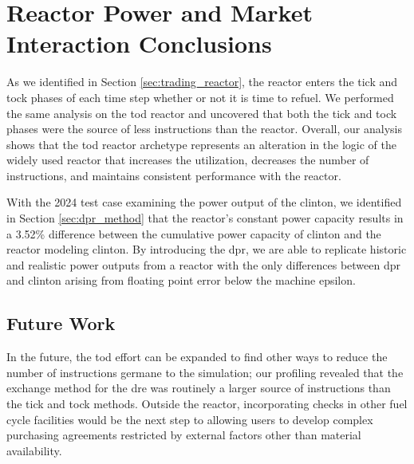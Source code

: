 \section{Reactor Power and Market Interaction Conclusions}

As we identified in Section \ref{sec:trading_reactor}, the \cycamore reactor enters the tick and tock phases of each time step whether or not it is time to refuel. We performed the same analysis on the \gls{tod} reactor and uncovered that both the tick and tock phases were the source of less instructions than the \cycamore reactor. Overall, our analysis shows that the \gls{tod} reactor archetype represents an alteration in the logic of the widely used \cycamore reactor that increases the utilization, decreases the number of instructions, and maintains consistent performance with the \cycamore reactor.

With the 2024 test case examining the power output of the \gls{clinton}, we identified in Section \ref{sec:dpr_method} that the \cycamore reactor's constant power capacity results in a 3.52\% difference between the cumulative power capacity of \gls{clinton} and the \cycamore reactor modeling \gls{clinton}. By introducing the \gls{dpr}, we are able to replicate historic and realistic power outputs from a reactor with the only differences between \gls{dpr} and \gls{clinton} arising from floating point error below the machine epsilon.

\subsection{Future Work}
\label{sec:time_future_work}

In the future, the \gls{tod} effort can be expanded to find other ways to reduce the number of instructions germane to the simulation; our profiling revealed that the exchange method for the \gls{dre} was routinely a larger source of instructions than the tick and tock methods. Outside the reactor, incorporating checks in other fuel cycle facilities would be the next step to allowing users to develop complex purchasing agreements restricted by external factors other than material availability.

